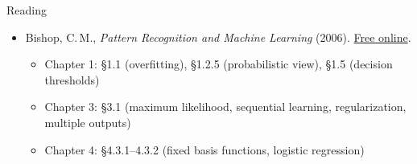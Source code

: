 \documentclass[10pt]{beamer}
\begin{document}
\begin{titledslide}{Reading}

  \begin{itemize}
  \item Bishop, C.\,M., \emph{Pattern Recognition and Machine Learning}
    (2006).
    \href{https://www.microsoft.com/en-us/research/uploads/prod/2006/01/Bishop-Pattern-Recognition-and-Machine-Learning-2006.pdf}{Free
      online}.
    \begin{itemize}
    \item Chapter 1: \S1.1 (overfitting), \S1.2.5 (probabilistic view),
      \S1.5 (decision thresholds)
    \item Chapter 3: \S3.1 (maximum likelihood, sequential learning,
      regularization, multiple outputs)
    \item Chapter 4: \S4.3.1--4.3.2 (fixed basis functions, logistic
      regression)
    \end{itemize}
  \end{itemize}

\end{titledslide}
\end{document}
